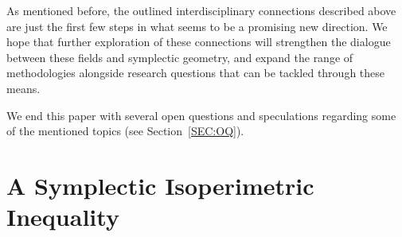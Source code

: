 \documentclass{icmart}
\theoremstyle{definition}
\begin{document}

\smallskip
As mentioned before, the outlined interdisciplinary connections described above  are just the first few steps in what seems to be a promising new direction. We hope that further exploration of these connections will strengthen the dialogue between these fields and symplectic geometry, and expand the range of methodologies alongside research questions that can be tackled through these means.
%
%
%

%
%


\smallskip

We end this paper with several open questions and speculations regarding some of the mentioned topics (see Section~\ref{SEC:OQ}).

\section{A Symplectic Isoperimetric Inequality} \label{SEC:ISOPERIMTERIC}
\end{document}
